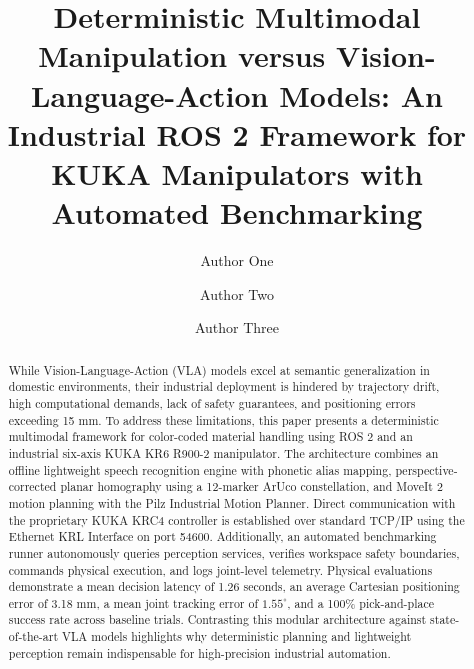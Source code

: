\documentclass{svproc}
\begin{document}
\mainmatter              %

\title{Deterministic Multimodal Manipulation versus Vision-Language-Action Models: An Industrial ROS 2 Framework for KUKA Manipulators with Automated Benchmarking}


\author{Author One \and Author Two \and Author Three}




\maketitle              %

\begin{abstract}
While Vision-Language-Action (VLA) models excel at semantic generalization in domestic environments, their industrial deployment is hindered by trajectory drift, high computational demands, lack of safety guarantees, and positioning errors exceeding 15 mm. To address these limitations, this paper presents a deterministic multimodal framework for color-coded material handling using ROS 2 \cite{ros2_2022} and an industrial six-axis KUKA KR6 R900-2 manipulator. The architecture combines an offline lightweight speech recognition engine with phonetic alias mapping, perspective-corrected planar homography using a 12-marker ArUco constellation, and MoveIt 2 \cite{moveit2014} motion planning with the Pilz Industrial Motion Planner. Direct communication with the proprietary KUKA KRC4 controller \cite{kuka_kss2018} is established over standard TCP/IP using the Ethernet KRL Interface \cite{kuka_eki2019} on port 54600. Additionally, an automated benchmarking runner autonomously queries perception services, verifies workspace safety boundaries, commands physical execution, and logs joint-level telemetry. Physical evaluations demonstrate a mean decision latency of 1.26 seconds, an average Cartesian positioning error of 3.18 mm, a mean joint tracking error of $1.55^\circ$, and a 100\% pick-and-place success rate across baseline trials. Contrasting this modular architecture against state-of-the-art VLA models highlights why deterministic planning and lightweight perception remain indispensable for high-precision industrial automation.

\end{abstract}
\end{document}
